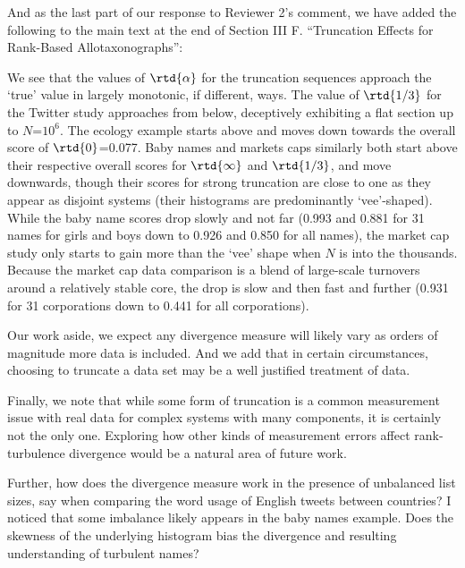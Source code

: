 And as the last part of our response to Reviewer 2's comment,
we have added the following to the main text at the end
of Section III F. ``Truncation Effects for Rank-Based Allotaxonographs'':
\begin{excerpt}
  We see that the values of $\rtd{\alpha}$ for the truncation
  sequences approach the `true' value in largely monotonic, if different, ways.
  The value of $\rtd{1/3}$ for the Twitter study approaches from below,
  deceptively exhibiting a flat section up to $N$=$10^{6}$.
  The ecology example starts above and moves down towards
  the overall score of $\rtd{0}$=0.077.
  Baby names and markets caps similarly both start above their
  respective overall scores for $\rtd{\infty}$ and $\rtd{1/3}$,
  and move downwards, though their scores for strong truncation
  are close to one as they appear as disjoint systems
  (their histograms are predominantly `vee'-shaped).
  While the baby name scores drop slowly and not far
  (0.993 and 0.881 for 31 names for girls and boys
  down to 0.926 and 0.850 for all names),
  the market cap study only starts to
  gain more than the `vee' shape when $N$ is into the thousands.
  Because the market cap data comparison is a blend of large-scale turnovers
  around a relatively stable core, the drop is slow and then fast and further
  (0.931 for 31 corporations down to 0.441 for all corporations).

  Our work aside, we expect any divergence measure will likely vary as orders
  of magnitude more data is included.
  And we add that in certain circumstances,
  choosing to truncate a data set may be a well justified treatment of data.

  Finally, we note that while some form of truncation is a common measurement issue with real
  data for complex systems with many components, it is certainly not the only one.
  Exploring how other kinds of measurement errors affect rank-turbulence divergence
  would be a natural area of future work.
\end{excerpt}

\begin{reviewercomment}
  Further, how does the divergence measure work in
  the presence of unbalanced list sizes, say when comparing the word
  usage of English tweets between countries?  I noticed that some
  imbalance likely appears in the baby names example.  Does the
  skewness of the underlying histogram bias the divergence and
  resulting understanding of turbulent names?
\end{reviewercomment}

